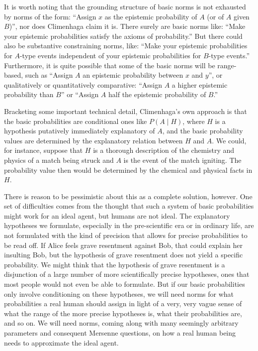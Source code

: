 It is worth noting that the grounding structure of basic norms is not exhausted by norms of the form:
``Assign $x$ as the epistemic probability of $A$ (or of $A$ given $B$)'', nor does Climenhaga claim it is.
There surely are basic norms like: ``Make your epistemic probabilities satisfy the axioms of probability.''
But there could also be substantive constraining norms, like: ``Make your epistemic probabilities for $A$-type 
events independent of your epistemic probabilities for $B$-type events.'' Furthermore, it is quite possible
that some of the basic norms will be range-based, such as ``Assign $A$ an epistemic probability between $x$ 
and $y$'', or qualitatively or quantitatively comparative: ``Assign $A$ a higher epistemic probability than
$B$'' or ``Assign $A$ half the epistemic probability of $B$.''

Bracketing some important technical detail, Climenhaga's own approach is that the basic probabilities are conditional 
ones like $P(A\mid H)$, where $H$ is a hypothesis putatively immediately explanatory of $A$, and the basic 
probability values are determined by the explanatory relation between $H$ and $A$. We could, for instance, 
suppose that $H$ is a thorough description of the chemistry and physics of a match being struck and $A$ 
is the event of the match igniting. The probability value then would be determined by the chemical and physical facts 
in $H$.

There is reason to be pessimistic about this as a complete solution, however. One set of difficulties comes
from the thought that such a system of basic probabilities might work for an ideal agent, but humans are not
ideal. The explanatory hypotheses we formulate, especially in the pre-scientific era or in ordinary life, are not formulated
with the kind of precision that allows for precise probabilities to be read off. If Alice feels grave resentment against
Bob, that could explain her insulting Bob, but the hypothesis of grave resentment does not yield a specific 
probability. We might think that the hypothesis of grave resentment is a disjunction of a large
number of more scientifically precise hypotheses, ones that most people would not even be able to formulate. 
But if our basic probabilities only involve conditioning on these hypotheses, we will need norms for what probabilities 
a real human should assign in light of a very, very vague sense of what the range of the more precise hypotheses is,
what their probabilities are, and so on. We will need norms, coming along with many seemingly arbitrary parameters
and consequent Mersenne questions, on how a real human being needs to approximate the ideal agent.

